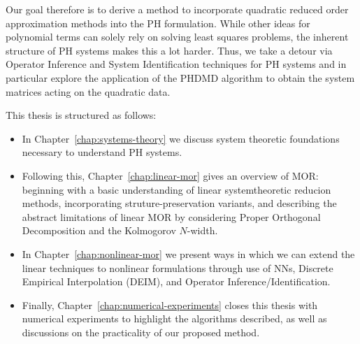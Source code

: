 
Our goal therefore is to derive a method to incorporate quadratic reduced order approximation methods into the \ac{PH} formulation.
While other ideas for polynomial terms can solely rely on solving least squares problems, the inherent structure of \ac{PH} systems makes this a lot harder.
Thus, we take a detour via Operator Inference and System Identification techniques for \ac{PH} systems and in particular explore the application of the \ac{PHDMD} algorithm to obtain the system matrices acting on the quadratic data.

This thesis is structured as follows:
\begin{itemize}
    \item In Chapter~\ref{chap:systems-theory} we discuss system theoretic foundations necessary to understand \ac{PH} systems.
    \item Following this, Chapter~\ref{chap:linear-mor} gives an overview of \ac{MOR}: beginning with a basic understanding of linear systemtheoretic reducion methods, incorporating struture-preservation variants, and describing the abstract limitations of linear MOR by considering Proper Orthogonal Decomposition and the Kolmogorov $N$-width.
    \item In Chapter~\ref{chap:nonlinear-mor} we present ways in which we can extend the linear techniques to nonlinear formulations through use of \acp{NN}, Discrete Empirical Interpolation (DEIM), and Operator Inference/Identification.
    \item Finally, Chapter~\ref{chap:numerical-experiments} closes this thesis with numerical experiments to highlight the algorithms described, as well as discussions on the practicality of our proposed method.
\end{itemize}
